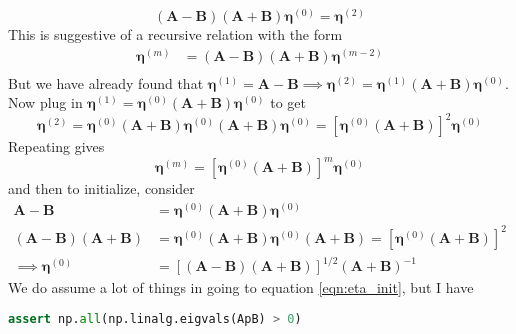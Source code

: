 \begin{equation}
    \left(\bm{A}-\bm{B}\right)\left(\bm{A}+\bm{B}\right)\bm{\eta}^{(0)} = \bm{\eta}^{(2)}
\end{equation}
This is suggestive of a recursive relation with the form
\begin{align}
    \bm{\eta}^{(m)} &= \left(\bm{A}-\bm{B}\right)\left(\bm{A}+\bm{B}\right)\bm{\eta}^{(m-2)} \\
\end{align}
But we have already found that $\bm{\eta}^{(1)} = \bm{A}-\bm{B} \implies \bm{\eta}^{(2)} = \bm{\eta}^{(1)}\left(\bm{A}+\bm{B}\right)\bm{\eta}^{(0)}$. Now plug in $\bm{\eta}^{(1)}=\bm{\eta}^{(0)}\left(\bm{A}+\bm{B}\right)\bm{\eta}^{(0)}$ to get
\begin{equation}
    \bm{\eta}^{(2)} = \bm{\eta}^{(0)}\left(\bm{A}+\bm{B}\right)\bm{\eta}^{(0)}\left(\bm{A}+\bm{B}\right)\bm{\eta}^{(0)} = \left[\bm{\eta}^{(0)}\left(\bm{A}+\bm{B}\right)\right]^2\bm{\eta}^{(0)}
\end{equation}
Repeating gives
\begin{equation}
    \boxed{\bm{\eta}^{(m)} = \left[\bm{\eta}^{(0)}\left(\bm{A}+\bm{B}\right)\right]^m\bm{\eta}^{(0)}}
\end{equation}
and then to initialize, consider
\begin{align}
    \bm{A} - \bm{B} &= \bm{\eta}^{(0)}\left(\bm{A}+\bm{B}\right)\bm{\eta}^{(0)} \\
    \left(\bm{A} - \bm{B}\right)\left(\bm{A}+\bm{B}\right) &= \bm{\eta}^{(0)}\left(\bm{A}+\bm{B}\right)\bm{\eta}^{(0)}\left(\bm{A}+\bm{B}\right) = \left[\bm{\eta}^{(0)}\left(\bm{A}+\bm{B}\right)\right]^2\\
    \implies \bm{\eta}^{(0)} &= \left[\left(\bm{A}-\bm{B}\right)\left(\bm{A}+\bm{B}\right)\right]^{1/2} \left(\bm{A}+\bm{B}\right)^{-1} 
    \label{eqn:eta_init}
\end{align}
We do assume a lot of things in going to equation \ref{eqn:eta_init}, but I have
\begin{lstlisting}[language=Python]
assert np.all(np.linalg.eigvals(ApB) > 0)
\end{lstlisting}

